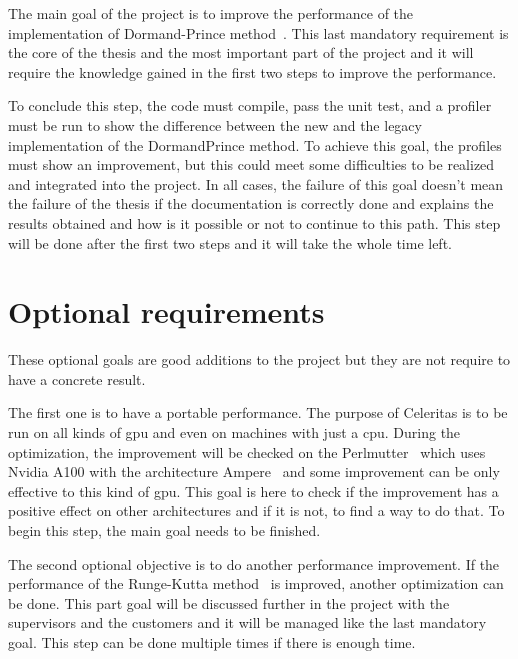 The main goal of the project is to improve the performance of the implementation of Dormand-Prince method~\cite{princeDormand}.
This last mandatory requirement is the core of the thesis and the most important part of the project and it will require the knowledge gained in the first two steps to improve the performance.

To conclude this step, the code must compile, pass the unit test, and a profiler must be run to show the difference between the new and the legacy implementation of the DormandPrince method.
To achieve this goal, the profiles must show an improvement, but this could meet some difficulties to be realized and integrated into the project.
In all cases, the failure of this goal doesn't mean the failure of the thesis if the documentation is correctly done and explains the results obtained and how is it possible or not to continue to this path.
This step will be done after the first two steps and it will take the whole time left.

\section{Optional requirements}
\label{ch:introduction:optional-requirements}

These optional goals are good additions to the project but they are not
require to have a concrete result.

The first one is to have a portable performance.
The purpose of Celeritas is to be run on all kinds of \acrshort{gpu} and even on machines with just a \acrshort{cpu}.
During the optimization, the improvement will be checked on the Perlmutter~\cite{Perlmutter} which uses Nvidia A100 with the architecture Ampere~\cite{ampere} and some improvement can be only effective to this kind of \acrshort{gpu}.
This goal is here to check if the improvement has a positive effect on other architectures and if it is not, to find a way to do that.
To begin this step, the main goal needs to be finished.

The second optional objective is to do another performance improvement.
If the performance of the Runge-Kutta method~\cite{Runge-Kutta-methods} is improved, another optimization can be done.
This part goal will be discussed further in the project with the supervisors and the customers and it will be managed like the last mandatory goal.
This step can be done multiple times if there is enough time.
